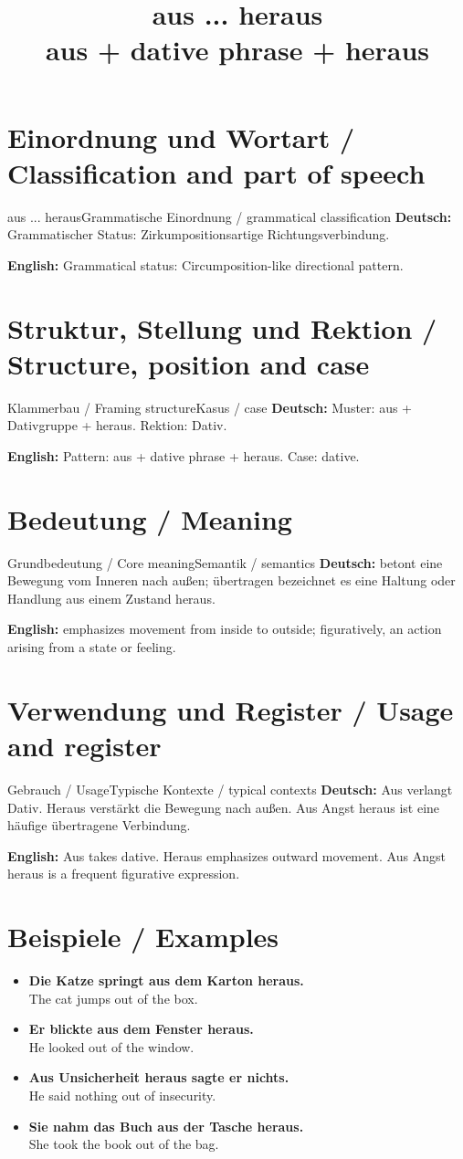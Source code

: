 \documentclass[a4paper,11pt]{article}
\title{aus ... heraus\\ \large aus + dative phrase + heraus}
\date{}
\newcommand{\GermanText}[1]{\textbf{Deutsch: }#1\par}
\newcommand{\EnglishText}[1]{{\small\color{SoftGray}\textbf{English: }#1\par}}
\newcommand{\ExampleItem}[2]{\item \textbf{#1}\\{\small\color{SoftGray}#2}}
\begin{document}
\maketitle
\tableofcontents
\newpage
\section{Einordnung und Wortart / Classification and part of speech}
\begin{grammarentry}{aus ... heraus}{Grammatische Einordnung / grammatical classification}
\GermanText{Grammatischer Status: Zirkumpositionsartige Richtungsverbindung.}
\EnglishText{Grammatical status: Circumposition-like directional pattern.}
\end{grammarentry}
\section{Struktur, Stellung und Rektion / Structure, position and case}
\begin{grammarentry}{Klammerbau / Framing structure}{Kasus / case}
\GermanText{Muster: aus + Dativgruppe + heraus. Rektion: Dativ.}
\EnglishText{Pattern: aus + dative phrase + heraus. Case: dative.}
\end{grammarentry}
\section{Bedeutung / Meaning}
\begin{grammarentry}{Grundbedeutung / Core meaning}{Semantik / semantics}
\GermanText{betont eine Bewegung vom Inneren nach außen; übertragen bezeichnet es eine Haltung oder Handlung aus einem Zustand heraus.}
\EnglishText{emphasizes movement from inside to outside; figuratively, an action arising from a state or feeling.}
\end{grammarentry}
\section{Verwendung und Register / Usage and register}
\begin{grammarentry}{Gebrauch / Usage}{Typische Kontexte / typical contexts}
\GermanText{Aus verlangt Dativ. Heraus verstärkt die Bewegung nach außen. Aus Angst heraus ist eine häufige übertragene Verbindung.}
\EnglishText{Aus takes dative. Heraus emphasizes outward movement. Aus Angst heraus is a frequent figurative expression.}
\end{grammarentry}
\section{Beispiele / Examples}
\begin{exbox}
\begin{itemize}
\ExampleItem{Die Katze springt aus dem Karton heraus.}{The cat jumps out of the box.}
\ExampleItem{Er blickte aus dem Fenster heraus.}{He looked out of the window.}
\ExampleItem{Aus Unsicherheit heraus sagte er nichts.}{He said nothing out of insecurity.}
\ExampleItem{Sie nahm das Buch aus der Tasche heraus.}{She took the book out of the bag.}
\end{itemize}
\end{exbox}
\end{document}
